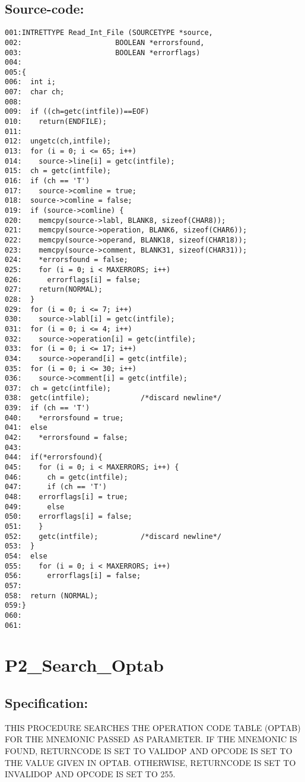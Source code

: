 \subsection*{Source-code:}
\begin{verbatim}
001:INTRETTYPE Read_Int_File (SOURCETYPE *source,
002:                      BOOLEAN *errorsfound,
003:                      BOOLEAN *errorflags)
004:
005:{
006:  int i;
007:  char ch;
008:
009:  if ((ch=getc(intfile))==EOF)
010:    return(ENDFILE);
011:
012:  ungetc(ch,intfile);
013:  for (i = 0; i <= 65; i++) 
014:    source->line[i] = getc(intfile);
015:  ch = getc(intfile);
016:  if (ch == 'T')
017:    source->comline = true;
018:  source->comline = false;
019:  if (source->comline) {
020:    memcpy(source->labl, BLANK8, sizeof(CHAR8));
021:    memcpy(source->operation, BLANK6, sizeof(CHAR6));
022:    memcpy(source->operand, BLANK18, sizeof(CHAR18));
023:    memcpy(source->comment, BLANK31, sizeof(CHAR31));
024:    *errorsfound = false;
025:    for (i = 0; i < MAXERRORS; i++)
026:      errorflags[i] = false;
027:    return(NORMAL);
028:  }
029:  for (i = 0; i <= 7; i++) 
030:    source->labl[i] = getc(intfile);
031:  for (i = 0; i <= 4; i++) 
032:    source->operation[i] = getc(intfile);
033:  for (i = 0; i <= 17; i++) 
034:    source->operand[i] = getc(intfile);
035:  for (i = 0; i <= 30; i++) 
036:    source->comment[i] = getc(intfile);
037:  ch = getc(intfile);
038:  getc(intfile);            /*discard newline*/
039:  if (ch == 'T')
040:    *errorsfound = true;
041:  else
042:    *errorsfound = false;
043:
044:  if(*errorsfound){
045:    for (i = 0; i < MAXERRORS; i++) {
046:      ch = getc(intfile);
047:      if (ch == 'T')
048:    errorflags[i] = true;
049:      else
050:    errorflags[i] = false;
051:    }
052:    getc(intfile);          /*discard newline*/
053:  }
054:  else
055:    for (i = 0; i < MAXERRORS; i++)
056:      errorflags[i] = false;
057:
058:  return (NORMAL);
059:}
060:
061:
\end{verbatim}
\section{P2\_Search\_Optab}
\subsection*{Specification:}
THIS PROCEDURE SEARCHES THE OPERATION CODE TABLE (OPTAB) FOR THE MNEMONIC
PASSED AS PARAMETER. IF THE MNEMONIC IS FOUND, RETURNCODE IS SET TO VALIDOP
AND OPCODE IS SET TO THE VALUE GIVEN IN OPTAB. OTHERWISE, RETURNCODE IS SET
TO INVALIDOP AND OPCODE IS SET TO 255.

